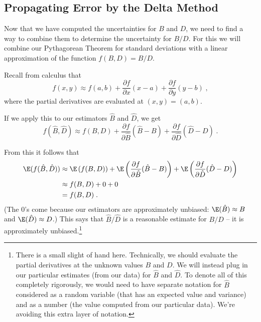 \documentclass[twoside]{book}\usepackage[]{graphicx}\usepackage[]{xcolor}
\begin{document}
\subsection{Propagating Error by the Delta Method}
Now that we have computed the uncertainties for $B$ and $D$, we need to find a way to combine
them to determine the uncertainty for $B/D$.  For this we will combine our Pythagorean Theorem
for standard deviations with a linear approximation of the function $f(B,D) = B/D$.

Recall from calculus that 
\[
f(x,y) \approx f(a, b)
+
\frac{\partial f}{\partial x} (x-a)
+
\frac{\partial f}{\partial y} (y-b) \;,
\]
where the partial derivatives are evaluated at $(x,y) = (a,b)$.

If we apply this to our estimators $\hat B$ and $\hat D$, we get
\[
f(\hat B,\hat D) \approx f( B, D ) 
+
\frac{\partial f}{\partial \hat B} (\hat B- B)
+
\frac{\partial f}{\partial \hat D} (\hat D- D)
\;.
\]

From this it follows that
\begin{align*}
	\E(f(\hat B,\hat D)) &\approx 
	\E\left(f( B, D)\right)
+
\E\left( \frac{\partial f}{\partial {\hat B}} (\hat B- B) \right)
+
\E\left( \frac{\partial f}{\partial \hat D} (\hat D- D) \right)
\\
&\approx f(B,D) + 0 + 0 
\\
&= f(B,D) \;.
\end{align*}
(The 0's come because our estimators are approximately unbiased: $\E(\hat B) \approx B$ and $\E(\hat D) \approx D$.)
This says that $\hat B/ \hat D$ is a reasonable estimate for $B/D$ -- it is approximately
unbiased.\footnote{There is a small slight of hand here.  Technically, we should evaluate
the partial derivatives at the unknown values $B$ and $D$.  We will instead plug in our 
particular estimates (from our data) for $\hat B$ and $\hat D$.  To denote all of this 
completely rigorously, we would need to have separate notation for $\hat B$ considered
as a random variable (that has an expected value and variance) and as a number (the value
computed from our particular data).  We're avoiding this extra layer of notation.}
\end{document}
